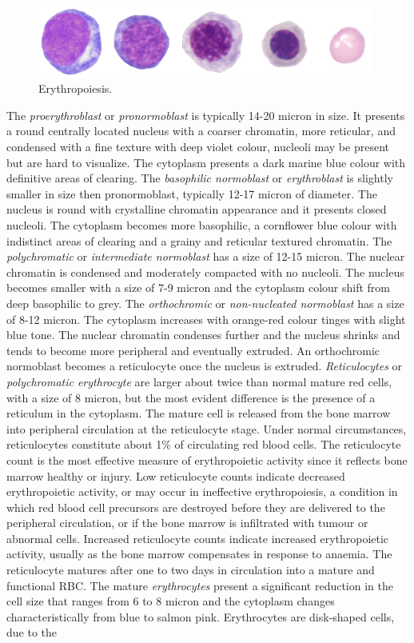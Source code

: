 \documentclass[final,a4paper,12pt,english]{UnicaPhdThesis3}
\begin{document}
\begin{figure}[!htbp]
\centering
\includegraphics[width=0.98\textwidth]{images/erythropoiesis}
\caption{\label{fig:Erythropoiesis} Erythropoiesis.}
\end{figure}

The \textit{proerythroblast} or \textit{pronormoblast} is typically 14-20 micron in size. It presents a round centrally located nucleus with a coarser chromatin, more reticular, and condensed with a fine texture with deep violet colour, nucleoli may be present but are hard to visualize. The cytoplasm presents a dark marine blue colour with definitive areas of clearing. The \textit{basophilic normoblast} or \textit{erythroblast} is slightly smaller in size then pronormoblast, typically 12-17 micron of diameter. The nucleus is round with crystalline chromatin appearance and it presents closed nucleoli. The cytoplasm becomes more basophilic, a cornflower blue colour with indistinct areas of clearing and a grainy and reticular textured chromatin. The \textit{polychromatic} or \textit{intermediate normoblast} has a size of 12-15 micron. The nuclear chromatin is condensed and moderately compacted with no nucleoli. The nucleus becomes smaller with a size of 7-9 micron and the cytoplasm colour shift from deep basophilic to grey. The \textit{orthochromic} or \textit{non-nucleated normoblast} has a size of 8-12 micron. The cytoplasm increases with orange-red colour tinges with slight blue tone. The nuclear chromatin condenses further and the nucleus shrinks and tends to become more peripheral and eventually extruded. An orthochromic normoblast becomes a reticulocyte once the nucleus is extruded. \textit{Reticulocytes} or \textit{polychromatic erythrocyte} are larger about twice than normal mature red cells, with a size of 8 micron, but the most evident difference is the presence of a reticulum in the cytoplasm. The mature cell is released from the bone marrow into peripheral circulation at the reticulocyte stage. Under normal circumstances, reticulocytes constitute about 1\% of circulating red blood cells. The reticulocyte count is the most effective measure of erythropoietic activity since it reflects bone marrow healthy or injury. Low reticulocyte counts indicate decreased erythropoietic activity, or may occur in ineffective erythropoiesis, a condition in which red blood cell precursors are destroyed before they are delivered to the peripheral circulation, or if the bone marrow is infiltrated with tumour or abnormal cells. Increased reticulocyte counts indicate increased erythropoietic activity, usually as the bone marrow compensates in response to anaemia. The reticulocyte matures after one to two days in circulation into a mature and functional RBC. The mature \textit{erythrocytes} present a significant reduction in the cell size that ranges from 6 to 8 micron and the cytoplasm changes characteristically from blue to salmon pink. Erythrocytes are disk-shaped cells, due to the 
\end{document}
